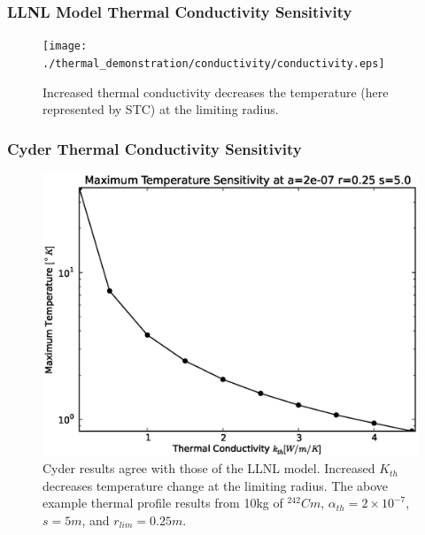 

\begin{frame}[ctb!]
\frametitle{LLNL Model Thermal Conductivity Sensitivity}

\begin{figure}[htbp!]
\begin{center}
\texttt{[image: ./thermal\_demonstration/conductivity/conductivity.eps]}
\end{center}
\caption[$K_{th}$ Sensitivity in LLNL Model]{Increased thermal conductivity 
decreases the temperature (here represented by STC) at the limiting radius.}
\label{fig:Cm242Kth_alpha_low}
\end{figure}

\end{frame}


\begin{frame}[ctb!]
\frametitle{Cyder Thermal Conductivity Sensitivity}
\begin{figure}[htbp!]
\begin{center}
\includegraphics[height=0.7\textheight]{./thermal_demonstration/conductivity/conductivity_cyder.eps}
\end{center}
\caption[$K_{th}$ Sensitivity in Cyder]
{Cyder results agree with those of the LLNL model. Increased $K_{th}$ decreases 
temperature change at the limiting radius. The above example thermal 
profile results from 10kg of $^{242}Cm$, $\alpha_{th}=2\times 10^{-7}$, $s=5m$, 
and $r_{lim}=0.25m$.}
\label{fig:kr}
\end{figure}
\end{frame}



